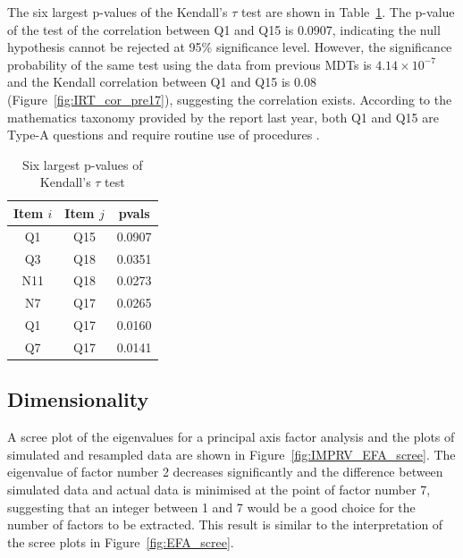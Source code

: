 \documentclass[a4paper]{report}
\begin{document}
The six largest p-values of the Kendall's $\tau$ test are shown in Table~\ref{tab:IMPRV_cortest}. The p-value of the test of the correlation between Q1 and Q15 is 0.0907, indicating the null hypothesis cannot be rejected at 95\% significance level. However, the significance probability of the same test using the data from previous MDTs is $4.14 \times 10^{-7}$ and the Kendall correlation between Q1 and Q15 is 0.08 (Figure~\ref{fig:IRT_cor_pre17}), suggesting the correlation exists. According to the mathematics taxonomy provided by the report last year, both Q1 and Q15 are Type-A questions and require routine use of procedures \cite{lastyear}. %

\begin{table}[ht]
  \centering
  \begin{tabular}{ccc}
    \hline
  Item $i$ & Item $j$ & pvals \\ 
    \hline
  Q1 & Q15 & 0.0907 \\ 
    Q3 & Q18 & 0.0351 \\ 
    N11 & Q18 & 0.0273 \\ 
    N7 & Q17 & 0.0265 \\ 
    Q1 & Q17 & 0.0160 \\ 
    Q7 & Q17 & 0.0141 \\ 
     \hline
  \end{tabular}
  \caption{\label{tab:IMPRV_cortest}Six largest p-values of Kendall's $\tau$ test}
\end{table}

\subsection{Dimensionality}

A scree plot of the eigenvalues for a principal axis factor analysis and the plots of simulated and resampled data are shown in Figure~\ref{fig:IMPRV_EFA_scree}. The eigenvalue of factor number 2 decreases significantly and the difference between simulated data and actual data is minimised at the point of factor number 7, suggesting that an integer between 1 and 7 would be a good choice for the number of factors to be extracted. This result is similar to the interpretation of the scree plots in Figure~\ref{fig:EFA_scree}. 
\end{document}
